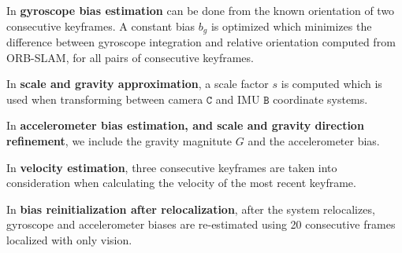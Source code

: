 In \textbf{gyroscope bias estimation} can be done from the known orientation of two consecutive keyframes. A constant bias $b_g$ is optimized which minimizes the difference between gyroscope integration and relative orientation computed from ORB-SLAM, for all pairs of consecutive keyframes.

In \textbf{scale and gravity approximation}, a scale  factor $s$ is computed which is used when transforming between camera $𝙲$ and IMU $𝙱$ coordinate systems.

In \textbf{accelerometer bias estimation, and scale and gravity direction refinement}, we include the gravity magnitute $G$ and the accelerometer bias.

In \textbf{velocity estimation}, three consecutive keyframes are taken into consideration when calculating the velocity of the most recent keyframe.

In \textbf{bias reinitialization after relocalization}, after the system relocalizes, gyroscope and accelerometer biases are re-estimated using 20 consecutive frames localized with only vision.



\FloatBarrier

